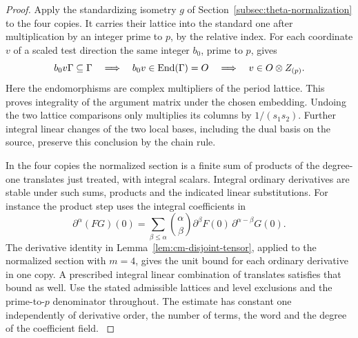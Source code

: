 \begin{proof}
Apply the standardizing isometry \(g\) of
Section~\ref{subsec:theta-normalization} to the four copies.
It carries their lattice into the standard one after multiplication
by an integer prime to \(p\), by the relative index.
For each coordinate \(v\) of a scaled test direction the same
integer \(b_0\), prime to \(p\), gives
\[
 b_0v\Gamma\subseteq\Gamma
 \quad\Longrightarrow\quad b_0v\in\operatorname{End}(\Gamma)=O
 \quad\Longrightarrow\quad v\in O\otimes Z_{(p)}.
\]
Here the endomorphisms are complex multipliers of the period lattice.
This proves integrality of the argument matrix under the chosen
embedding. Undoing the two lattice comparisons only multiplies
its columns by \(1/(s_1s_2)\). Further integral linear changes
of the two local bases, including the dual basis on the source,
preserve this conclusion by the chain rule.

In the four copies the normalized section is a finite sum of
products of the degree-one translates just treated, with
integral scalars. Integral ordinary derivatives are stable under
such sums, products and the indicated linear substitutions.
For instance the product step uses the integral coefficients in
\[
  \partial^\alpha(FG)(0)=\sum_{\beta\le\alpha}\binom{\alpha}{\beta}\partial^\beta F(0)\,\partial^{\alpha-\beta}G(0).
\]
The derivative identity in Lemma~\ref{lem:cm-disjoint-tensor}, applied
to the normalized section with \(m=4\), gives the unit bound for each
ordinary derivative in one copy. A prescribed
integral linear combination of translates satisfies that
bound as well. Use the stated admissible lattices and level exclusions and the prime-to-\(p\) denominator throughout. The estimate has constant one independently
of derivative order, the number of terms, the word and the
degree of the coefficient field. \label{cor:baseline-jets-2}
\end{proof}

